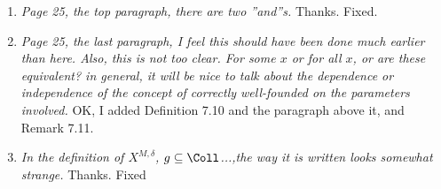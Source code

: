 \documentclass[oneside,12pt]{amsart}
\begin{document}
\begin{enumerate} [label=\arabic*)]
\item \emph{Page 25, the top paragraph, there are two ”and”s.} Thanks. Fixed.

\item \emph{Page 25, the last paragraph, I feel this should have been done much earlier than here.
Also, this is not too clear. For some $x$ or for all $x$, or are these equivalent? in general,
it will be nice to talk about the dependence or independence of the concept of correctly
well-founded on the parameters involved.}
OK, I added Definition 7.10 and the paragraph above it, and Remark 7.11.

\item  \emph{In the definition of $X^{M,\delta}$, 
$g \subseteq \Coll$...,the way it is written looks somewhat strange.} Thanks. Fixed






















\end{enumerate}




\end{document}
